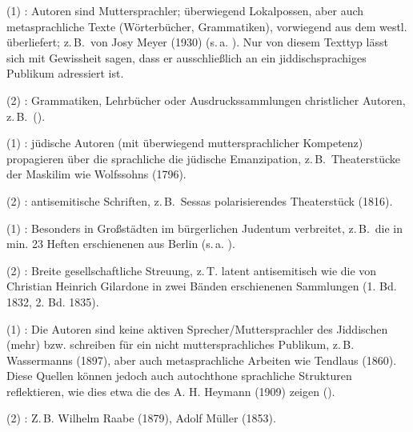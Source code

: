 	 \begin{description}
	  \item [Funktionstyp A] 
	  \item (1) : Autoren sind Muttersprachler; überwiegend Lokalpossen, aber auch metasprachliche Texte (Wörterbücher, Grammatiken), vorwiegend aus dem westl. \hai{{\SWJ}} überliefert; z.\,B.\,  von Josy Meyer (1930) (s.\,a. \citealt{Schaefer2014}). Nur von diesem Texttyp lässt sich mit Gewissheit sagen, dass er ausschließlich an ein jiddischsprachiges Publikum adressiert ist.
	  \item (2) : Grammatiken, Lehrbücher oder Ausdruckssammlungen christlicher Autoren, z.\,B.\,  (\citealt{Friedrich1784}). 
	  \item [Funktionstyp B] 
	  \item (1) : jüdische Autoren (mit überwiegend muttersprachlicher Kompetenz) propagieren über die sprachliche  die jüdische Emanzipation, z.\,B.\, Theaterstücke der Maskilim wie Wolfssohns  (1796).
	  \item (2) : antisemitische Schriften, z.\,B.\, Sessas polarisierendes Theaterstück  (1816).
	  \item [Funktionstyp C] 
	  \item (1) : Besonders in Großstädten im bürgerlichen Judentum verbreitet, z.\,B.\, die in min. 23 Heften erschienenen  aus Berlin (s.\,a. \citealt{Gruschka2003}). %
	  \item (2) : Breite gesellschaftliche Streuung, z.\,T. latent antisemitisch wie die von Christian Heinrich Gilardone in zwei Bänden erschienenen Sammlungen  (1. Bd. 1832, 2. Bd. 1835).
	  
	\item [Funktionstyp D]  
	  \item (1) : Die Autoren sind keine aktiven Sprecher/Muttersprachler des Jiddischen (mehr) bzw. schreiben für ein nicht muttersprachliches Publikum, z.\,B.\, Wassermanns  (1897), aber auch metasprachliche Arbeiten wie Tendlaus  (1860). Diese Quellen können jedoch auch autochthone sprachliche Strukturen reflektieren, wie dies etwa die  des A. H. Heymann (1909) zeigen (\citealt{Schaefer2013}).
	  \item (2)  : Z.\,B. Wilhelm Raabe  (1879),  Adolf Müller  (1853).
	 \end{description}


